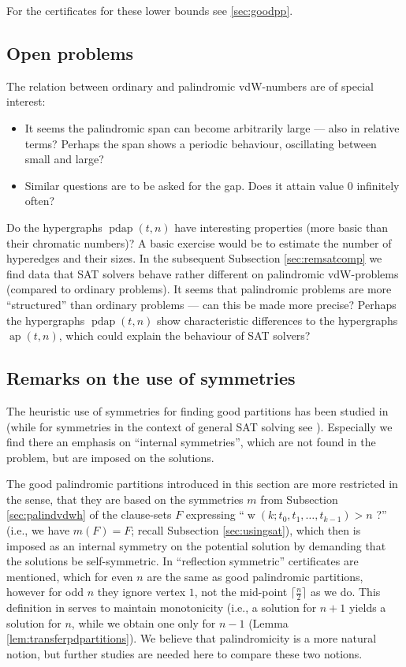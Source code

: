 \documentclass[final,3p,times]{elsarticle}
\theoremstyle{definition}
\newcommand{\ceil}[1]{\lceil #1 \rceil}
\DeclareMathOperator{\vdw}{w}
\DeclareMathOperator{\arithp}{ap}
\DeclareMathOperator{\pdarithp}{pdap}
\begin{document}
For the certificates for these lower bounds see \ref{sec:goodpp}.





\subsection{Open problems}
\label{sec:pdopen}

The relation between ordinary and palindromic vdW-numbers are of special interest:
\begin{itemize}
\item It seems the palindromic span can become arbitrarily large --- also in relative terms? Perhaps the span shows a periodic behaviour, oscillating between small and large?
\item Similar questions are to be asked for the gap. Does it attain value $0$ infinitely often?
\end{itemize}
Do the hypergraphs $\pdarithp(t,n)$ have interesting properties (more basic than their chromatic numbers)? A basic exercise would be to estimate the number of hyperedges and their sizes. In the subsequent Subsection \ref{sec:remsatcomp} we find data that SAT solvers behave rather different on palindromic vdW-problems (compared to ordinary problems). It seems that palindromic problems are more ``structured'' than ordinary problems --- can this be made more precise? Perhaps the hypergraphs $\pdarithp(t,n)$ show characteristic differences to the hypergraphs $\arithp(t,n)$, which could explain the behaviour of SAT solvers?


\subsection{Remarks on the use of symmetries}
\label{sec:remsym}

The heuristic use of symmetries for finding good partitions has been studied in \cite{herwig,HeuleWalsh2010SolutionsSymmetry,HeuleWalsh2010SolutionsSymmetryW} (while for symmetries in the context of general SAT solving see \cite{Sak09HBSAT}). Especially we find there an emphasis on ``internal symmetries'', which are not found in the problem, but are imposed on the solutions.

The good palindromic partitions introduced in this section are more restricted in the sense, that they are based on the symmetries $m$ from Subsection \ref{sec:palindvdwh} of the clause-sets $F$ expressing ``$\vdw(k; t_0, t_1,\ldots, t_{k-1}) > n$ ?'' (i.e., we have $m(F) = F$; recall Subsection \ref{sec:usingsat}), which then is imposed as an internal symmetry on the potential solution by demanding that the solutions be self-symmetric. In \cite{herwig} ``reflection symmetric'' certificates are mentioned, which for even $n$ are the same as good palindromic partitions, however for odd $n$ they ignore vertex $1$, not the mid-point $\ceil{\frac n2}$ as we do. This definition in \cite{herwig} serves to maintain monotonicity (i.e., a solution for $n+1$ yields a solution for $n$, while we obtain one only for $n-1$ (Lemma \ref{lem:transferpdpartitions}). We believe that palindromicity is a more natural notion, but further studies are needed here to compare these two notions.
\end{document}
